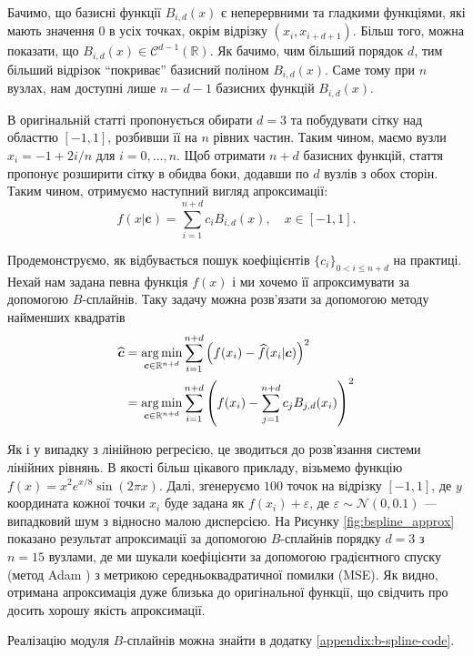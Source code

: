 Бачимо, що базисні функції $B_{i,d}(x)$ є неперервними та гладкими функціями,
які мають значення $0$ в усіх точках, окрім відрізку $(x_i,x_{i+d+1})$. Більш
того, можна показати, що $B_{i,d}(x) \in \mathcal{C}^{d-1}(\mathbb{R})$. Як бачимо, чим
більший порядок $d$, тим більший відрізок ``покриває'' базисний поліном
$B_{i,d}(x)$. Саме тому при $n$ вузлах, нам доступні лише 
$n-d-1$ базисних функцій $B_{i,d}(x)$. 

В оригінальній статті пропонується обирати $d=3$ та побудувати сітку над
областтю $[-1,1]$, розбивши її на $n$ рівних частин. Таким чином, маємо вузли
$x_i = -1 + 2i/n$ для $i=0,\dots,n$. Щоб отримати $n+d$ базисних функцій, стаття
пропонує розширити сітку в обидва боки, додавши по $d$ вузлів з обох сторін.
Таким чином, отримуємо наступний вигляд апроксимації:
\begin{equation}
    \widehat{f}(x|\boldsymbol{c}) = \sum_{i=1}^{n+d} c_i B_{i,d}(x), \quad x \in [-1,1].
\end{equation}

Продемонструємо, як відбувається пошук коефіцієнтів $\{c_i\}_{0 < i \leq n+d}$
на практиці. Нехай нам задана певна функція $f(x)$ і ми хочемо її апроксимувати
за допомогою $B$-сплайнів. Таку задачу можна розв'язати за допомогою методу
найменших квадратів
\begin{align}
    \widehat{\boldsymbol{c}} &= \operatorname*{arg\,min}_{\boldsymbol{c} \in \mathbb{R}^{n+d}} \sum_{i=1}^{n+d} \left(f(x_i) - \widehat{f}(x_i|\boldsymbol{c})\right)^2 \\
    &= \operatorname*{arg\,min}_{\boldsymbol{c} \in \mathbb{R}^{n+d}} \sum_{i=1}^{n+d} \left(f(x_i) - \sum_{j=1}^{n+d} c_j B_{j,d}(x_i)\right)^2
\end{align}

Як і у випадку з лінійною регресією, це зводиться до розв'язання системи
лінійних рівнянь. В якості більш цікавого прикладу, візьмемо функцію $f(x) = x^2
e^{x/8} \sin(2\pi x)$. Далі, згенеруємо $100$ точок на відрізку $[-1,1]$, де $y$
координата кожної точки $x_i$ буде задана як $f(x_i)+\varepsilon$, де
$\varepsilon \sim \mathcal{N}(0,0.1)$ --- випадковий шум з відносно малою
дисперсією. На Рисунку \ref{fig:bspline_approx} показано результат апроксимації
за допомогою $B$-сплайнів порядку $d=3$ з $n=15$ вузлами, де ми шукали 
коефіцієнти за допомогою градієнтного спуску (метод Adam \cite{adam}) 
з метрикою середньоквадратичної помилки (MSE). Як видно, отримана
апроксимація дуже близька до оригінальної функції, що свідчить про
досить хорошу якість апроксимації.

Реалізацію модуля $B$-сплайнів можна знайти в додатку \ref{appendix:b-spline-code}.

